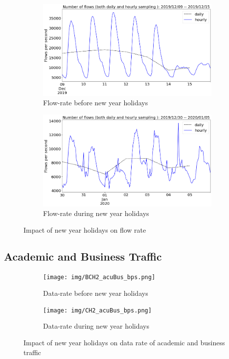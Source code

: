\documentclass[10pt, journal, letterpaper]{IEEEtran}
\newcommand\linearFigSze{0.48}
\begin{document}
\begin{figure}
    \begin{subfigure}{\linearFigSze\textwidth}
          \centering
          \includegraphics[width=\columnwidth]{img/BCH2_flowrate.png}
          \caption{Flow-rate before new year holidays}
          \label{fig:BCH2_fps}
    \end{subfigure}
    \begin{subfigure}{\linearFigSze\textwidth}
          \centering
          \includegraphics[width=\columnwidth]{img/CH2_flowrate.png}
          \caption{Flow-rate during new year holidays}
          \label{fig:CH2_fps}
    \end{subfigure}
    \caption{Impact of new year holidays on flow rate}
    \label{fig:flowrate_BCH_CH}
\end{figure}

\subsection{Academic and Business Traffic}
\begin{figure}
    \begin{subfigure}{\linearFigSze\textwidth}
          \centering
          \texttt{[image: img/BCH2\_acuBus\_bps.png]}
          \caption{Data-rate before new year holidays}
          \label{fig:BCH2_acaBus_bps}
    \end{subfigure}
    \begin{subfigure}{\linearFigSze\textwidth}
          \centering
          \texttt{[image: img/CH2\_acuBus\_bps.png]}
          \caption{Data-rate during new year holidays}
          \label{fig:CH2_acaBus_bps}
    \end{subfigure}
    \caption{Impact of new year holidays on data rate of academic and business traffic}
    \label{fig:datarate_acaBus_BCH_CH}
\end{figure}
\end{document}
